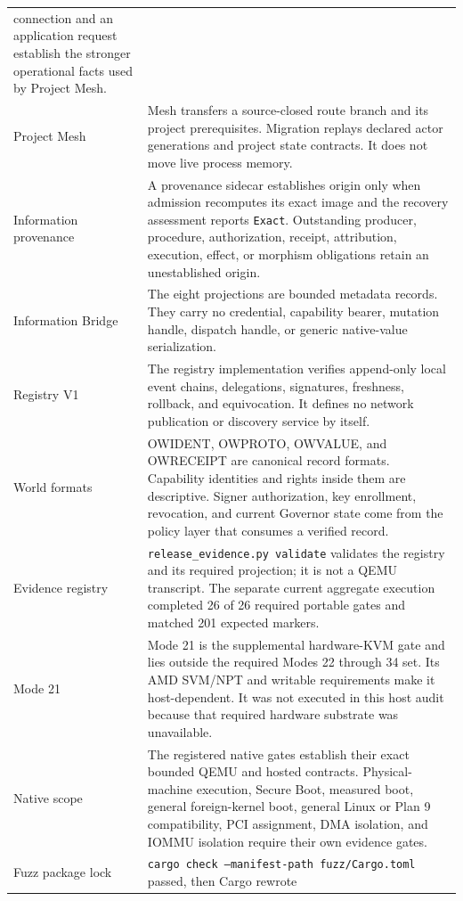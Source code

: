 \documentclass[11pt,oneside]{article}
\begin{document}
\begin{longtable}{P{0.23\textwidth} P{0.69\textwidth}}
connection and an application request establish the stronger operational
facts used by Project Mesh. \\
Project Mesh &
Mesh transfers a source-closed route branch and its project prerequisites.
Migration replays declared actor generations and project state contracts. It
does not move live process memory. \\
Information provenance &
A provenance sidecar establishes origin only when admission recomputes its
exact image and the recovery assessment reports \texttt{Exact}. Outstanding
producer, procedure, authorization, receipt, attribution, execution, effect,
or morphism obligations retain an unestablished origin. \\
Information Bridge &
The eight projections are bounded metadata records. They carry no credential,
capability bearer, mutation handle, dispatch handle, or generic native-value
serialization. \\
Registry V1 &
The registry implementation verifies append-only local event chains,
delegations, signatures, freshness, rollback, and equivocation. It defines no
network publication or discovery service by itself. \\
World formats &
OWIDENT, OWPROTO, OWVALUE, and OWRECEIPT are canonical record formats.
Capability identities and rights inside them are descriptive. Signer
authorization, key enrollment, revocation, and current Governor state come
from the policy layer that consumes a verified record. \\
Evidence registry &
\texttt{release\_evidence.py validate} validates the registry and its required
projection; it is not a QEMU transcript. The separate current aggregate
execution completed 26 of 26 required portable gates and matched 201 expected
markers. \\
Mode 21 &
Mode 21 is the supplemental hardware-KVM gate and lies outside the required
Modes 22 through 34 set. Its AMD SVM/NPT and writable 
requirements make it host-dependent. It was not executed in this host audit
because that required hardware substrate was unavailable. \\
Native scope &
The registered native gates establish their exact bounded QEMU and hosted
contracts. Physical-machine execution, Secure Boot, measured boot, general
foreign-kernel boot, general Linux or Plan 9 compatibility, PCI assignment,
DMA isolation, and IOMMU isolation require their own evidence gates. \\
Fuzz package lock &
\texttt{cargo check --manifest-path fuzz/Cargo.toml} passed, then Cargo rewrote

\end{longtable}
\end{document}

